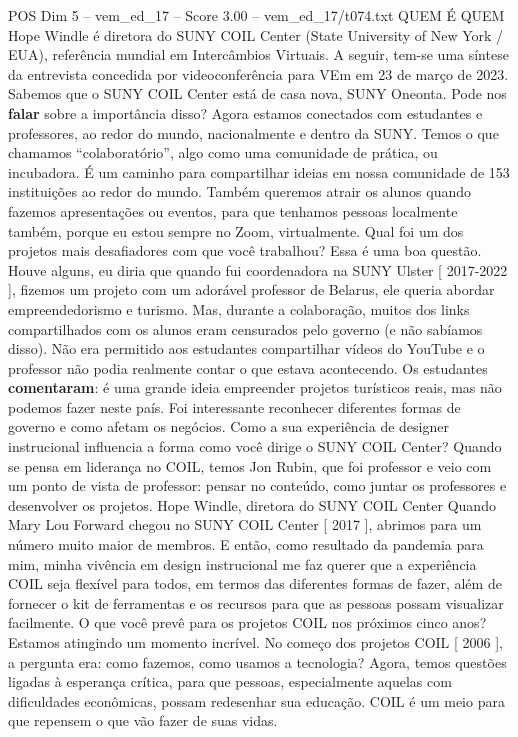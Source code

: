 \begin{textsample}{POS Dim 5 – vem\_ed\_17 – Score 3.00 – vem\_ed\_17/t074.txt}  \label{ex:f5_pos_139}
QUEM É QUEM Hope Windle é diretora do SUNY COIL Center (State University of New York / EUA), referência mundial em Intercâmbios Virtuais.
A seguir, tem-se uma síntese da entrevista concedida por videoconferência para VEm em 23 de março de 2023.
Sabemos que o SUNY COIL Center está de casa nova, SUNY Oneonta.
Pode nos \textbf{falar} sobre a importância disso?
Agora estamos conectados com estudantes e professores, ao redor do mundo, nacionalmente e dentro da SUNY.
Temos o que chamamos “colaboratório”, algo como uma comunidade de prática, ou incubadora.
É um caminho para compartilhar ideias em nossa comunidade de 153 instituições ao redor do mundo.
Também queremos atrair os alunos quando fazemos apresentações ou eventos, para que tenhamos pessoas localmente também, porque eu estou sempre no Zoom, virtualmente.
Qual foi um dos projetos mais desafiadores com que você trabalhou?
Essa é uma boa questão.
Houve alguns, eu diria que quando fui coordenadora na SUNY Ulster [ 2017-2022 ], fizemos um projeto com um adorável professor de Belarus, ele queria abordar empreendedorismo e turismo.
Mas, durante a colaboração, muitos dos links compartilhados com os alunos eram censurados pelo governo (e não sabíamos disso).
Não era permitido aos estudantes compartilhar vídeos do YouTube e o professor não podia realmente contar o que estava acontecendo.
Os estudantes \textbf{comentaram}: é uma grande ideia empreender projetos turísticos reais, mas não podemos fazer neste país.
Foi interessante reconhecer diferentes formas de governo e como afetam os negócios.
Como a sua experiência de designer instrucional influencia a forma como você dirige o SUNY COIL Center?
Quando se pensa em liderança no COIL, temos Jon Rubin, que foi professor e veio com um ponto de vista de professor: pensar no conteúdo, como juntar os professores e desenvolver os projetos.
Hope Windle, diretora do SUNY COIL Center Quando Mary Lou Forward chegou no SUNY COIL Center [ 2017 ], abrimos para um número muito maior de membros.
E então, como resultado da pandemia para mim, minha vivência em design instrucional me faz querer que a experiência COIL seja flexível para todos, em termos das diferentes formas de fazer, além de fornecer o kit de ferramentas e os recursos para que as pessoas possam visualizar facilmente.
O que você prevê para os projetos COIL nos próximos cinco anos?
Estamos atingindo um momento incrível.
No começo dos projetos COIL [ 2006 ], a pergunta era: como fazemos, como usamos a tecnologia?
Agora, temos questões ligadas à esperança crítica, para que pessoas, especialmente aquelas com dificuldades econômicas, possam redesenhar sua educação.
COIL é um meio para que repensem o que vão fazer de suas vidas.

\end{textsample}
